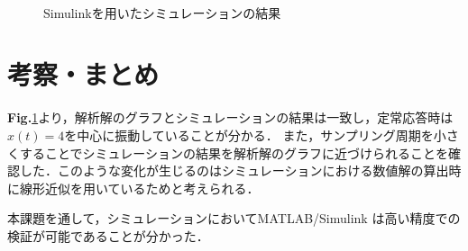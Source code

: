 \documentclass[a4paper,12pt]{jarticle}
\begin{document}
\begin{figure}[tb]
\\
 \vspace{0.5cm}
 \caption{Simulinkを用いたシミュレーションの結果}
 \label{Mat_sim}
\end{figure}
\newpage
\section{考察・まとめ}
{\bf Fig.}{\ref{Mat_sim}}より，解析解のグラフとシミュレーションの結果は一致し，定常応答時は$ x(t)= 4 $を中心に振動していることが分かる．
また，サンプリング周期を小さくすることでシミュレーションの結果を解析解のグラフに近づけられることを確認した．このような変化が生じるのはシミュレーションにおける数値解の算出時に線形近似を用いているためと考えられる．

本課題を通して，シミュレーションにおいてMATLAB/Simulink は高い精度での検証が可能であることが分かった．


\end{document}
